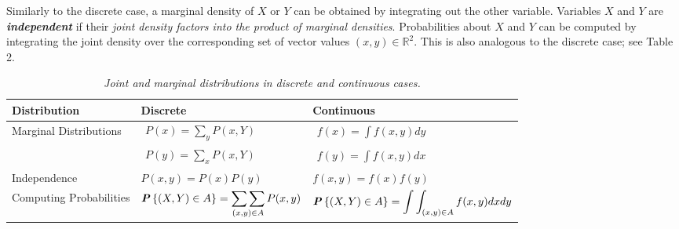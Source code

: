 Similarly to the discrete case, a marginal density of $X$ or $Y$ can be obtained by integrating out the other variable. Variables $X$ and $Y$ are \textit{\textbf{independent}} if their \textit{joint density factors into the product of marginal densities}. Probabilities about $X$ and $Y$ can be computed by integrating the joint density over the corresponding set of vector values $(x, y) \in \mathbb{R}^2$. This is also analogous to the discrete case; see Table 2.

\begin{table}[ht]
  \renewcommand{\arraystretch}{2}
  \centering
  \begin{tabular}{|l|l|l|} 
  \hline
  \textbf{Distribution}                   & \textbf{Discrete}                                           & \textbf{Continuous}                                             \\ 
  \hline
  \multirow{2}{*}{Marginal
  Distributions} & $\begin{aligned}P(x) = \sum_y P(x, Y)\end{aligned}$                                     & $\begin{aligned}f(x) = \int f(x, y)dy\end{aligned}$                                         \\
                                          & $\begin{aligned}P(y) = \sum_x P(x, Y)\end{aligned}$                                     & $\begin{aligned}f(y) = \int f(x, y)dx\end{aligned}$                                         \\ 
  \hline
  Independence                            & $P(x, y) = P(x)P(y)$                                        & $f(x, y) = f(x) f(y)$                                           \\ 
  \hline
  Computing
  Probabilities                 & $\begin{aligned}\textbf{\textit{P}}\left\{(X, Y) \in A \right\} = \mathop{\sum\sum}_{(x, y) \in A} P(x, y)\end{aligned}$ & $\begin{aligned}\textbf{\textit{P}}\left\{(X, Y) \in A\right\} = \int \int_{(x, y) \in A} f(x, y) dx dy\end{aligned}$  \\
  \hline
  \end{tabular}
  \caption{\textit{Joint and marginal distributions in discrete and continuous cases.}}
\end{table}

